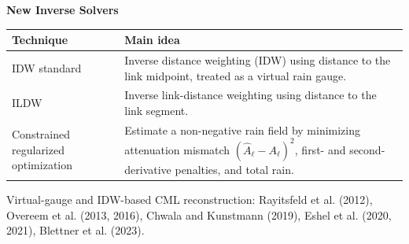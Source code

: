 \documentclass[aspectratio=169]{beamer}
\begin{document}

\begin{frame}[plain]
    \vspace{-0.5mm}
    \begin{center}\large\bfseries New Inverse Solvers\end{center}
    \vspace{5mm}

    \renewcommand{\arraystretch}{1.45}
    \begin{tabular}{p{}p{}}
        \textbf{Technique}                   & \textbf{Main idea}                                              \\
        \hline
        IDW standard                         &
        Inverse distance weighting (IDW) using distance to the link midpoint, treated as a virtual rain gauge. \\
        ILDW                                 &
        Inverse link-distance weighting using distance to the link segment.                                    \\
        Constrained regularized optimization &
        Estimate a non-negative rain field by minimizing attenuation mismatch
        $(\hat A_\ell-A_\ell)^2$, first- and second-derivative penalties, and total rain.                      \\
    \end{tabular}

    \vfill
    {\tiny Virtual-gauge and IDW-based CML reconstruction: Rayitsfeld et al. (2012), Overeem et al. (2013, 2016), Chwala and Kunstmann (2019), Eshel et al. (2020, 2021), Blettner et al. (2023).}
\end{frame}

\end{document}
